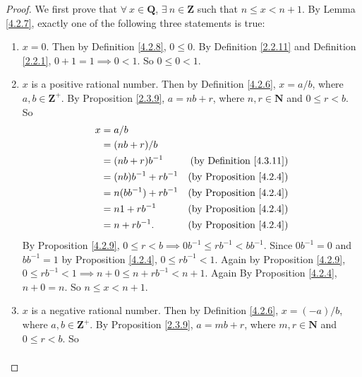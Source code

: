 \begin{proof}
    We first prove that \(\forall\ x \in \mathbf{Q}\), \(\exists\ n \in \mathbf{Z}\) such that \(n \leq x < n + 1\).
    By Lemma \ref{4.2.7}, exactly one of the following three statements is true:
    \begin{enumerate}
        \item \(x = 0\).
              Then by Definition \ref{4.2.8}, \(0 \leq 0\).
              By Definition \ref{2.2.11} and Definition \ref{2.2.1}, \(0 + 1 = 1 \implies 0 < 1\).
              So \(0 \leq 0 < 1\).
        \item \(x\) is a positive rational number.
              Then by Definition \ref{4.2.6}, \(x = a / b\), where \(a, b \in \mathbf{Z}^+\).
              By Proposition \ref{2.3.9}, \(a = nb + r\), where \(n, r \in \mathbf{N}\) and \(0 \leq r < b\).
              So
              \begin{align*}
                  x & = a / b                                                      \\
                    & = (nb + r) / b                                               \\
                    & = (nb + r)b^{-1}       & \text{(by Definition \ref{4.3.11})} \\
                    & = (nb)b^{-1} + rb^{-1} & \text{(by Proposition \ref{4.2.4})} \\
                    & = n(bb^{-1}) + rb^{-1} & \text{(by Proposition \ref{4.2.4})} \\
                    & = n1 + rb^{-1}         & \text{(by Proposition \ref{4.2.4})} \\
                    & = n + rb^{-1}.         & \text{(by Proposition \ref{4.2.4})}
              \end{align*}
              By Proposition \ref{4.2.9}, \(0 \leq r < b \implies 0b^{-1} \leq rb^{-1} < bb^{-1}\).
              Since \(0b^{-1} = 0\) and \(bb^{-1} = 1\) by Proposition \ref{4.2.4}, \(0 \leq rb^{-1} < 1\).
              Again by Proposition \ref{4.2.9}, \(0 \leq rb^{-1} < 1 \implies n + 0 \leq n + rb^{-1} < n + 1\).
              Again By Proposition \ref{4.2.4}, \(n + 0 = n\).
              So \(n \leq x < n + 1\).
        \item \(x\) is a negative rational number.
              Then by Definition \ref{4.2.6}, \(x = (-a) / b\), where \(a, b \in \mathbf{Z}^+\).
              By Proposition \ref{2.3.9}, \(a = mb + r\), where \(m, r \in \mathbf{N}\) and \(0 \leq r < b\).
              So
              \begin{align*}

\end{align*}
\end{enumerate}
\end{proof}
